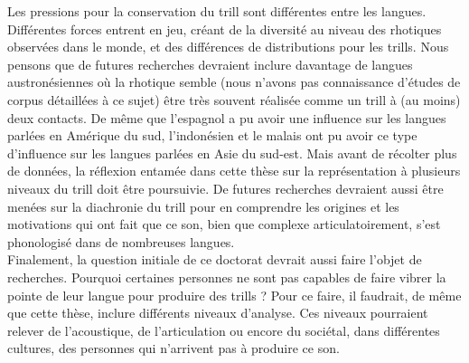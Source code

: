 
Les pressions pour la conservation du trill sont différentes entre les langues. Différentes forces entrent en jeu, créant de la diversité au niveau des rhotiques observées dans le monde, et des différences de distributions pour les trills.
Nous pensons que de futures recherches devraient inclure davantage de langues austronésiennes où la rhotique semble (nous n'avons pas connaissance d'études de corpus détaillées à ce sujet) être très souvent réalisée comme un trill à (au moins) deux contacts.
De même que l'espagnol a pu avoir une influence sur les langues parlées en Amérique du sud, l'indonésien et le malais ont pu avoir ce type d'influence sur les langues parlées en Asie du sud-est.
Mais avant de récolter plus de données, la réflexion entamée dans cette thèse sur la représentation à plusieurs niveaux du trill doit être poursuivie.
De futures recherches devraient aussi être menées sur la diachronie du trill pour en comprendre les origines et les motivations qui ont fait que ce son, bien que complexe articulatoirement, s'est phonologisé dans de nombreuses langues.\\

Finalement, la question initiale de ce doctorat devrait aussi faire l'objet de recherches. Pourquoi certaines personnes ne sont pas capables de faire vibrer la pointe de leur langue pour produire des trills ? Pour ce faire, il faudrait, de même que cette thèse, inclure différents niveaux d'analyse. Ces niveaux pourraient relever de l'acoustique, de l'articulation ou encore du sociétal, dans différentes cultures, des personnes qui n'arrivent pas à produire ce son.

